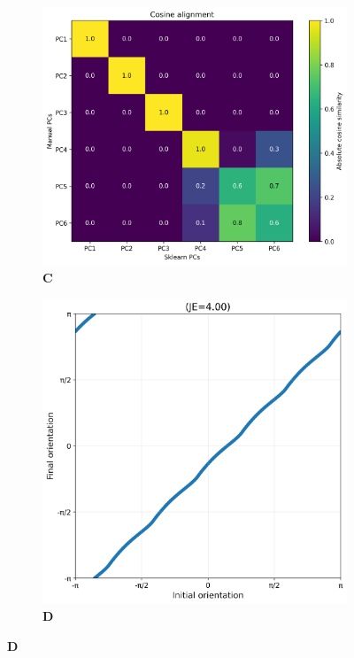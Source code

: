 \documentclass[11pt,a4paper]{article}
\begin{document}
\begin{figure}[H]
\vspace{0.5cm}

\begin{subfigure}{0.45\textwidth}
    \centering
    \caption*{\textbf{C}}
    \includegraphics[width=\textwidth]{cosine_alignment.png}
\end{subfigure}
\hfill
\begin{subfigure}{0.45\textwidth}
    \centering
    \caption*{\textbf{D}}
    \includegraphics[width=\textwidth]{orientation_comparison.png}
\end{subfigure}


\end{figure}
\end{document}
